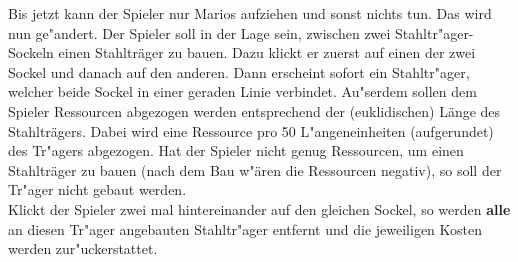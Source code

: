 Bis jetzt kann der Spieler nur Marios aufziehen und sonst nichts tun. Das wird nun  ge"andert. Der Spieler soll in der Lage sein, zwischen zwei Stahltr"ager-Sockeln einen Stahlträger zu bauen. Dazu klickt er zuerst auf einen der zwei Sockel und danach auf den anderen. 
Dann erscheint sofort ein Stahltr"ager, welcher beide Sockel in einer geraden Linie verbindet. Au"serdem sollen dem Spieler Ressourcen abgezogen werden entsprechend der (euklidischen) Länge des Stahlträgers. Dabei wird eine Ressource pro 50 L"angeneinheiten (aufgerundet) des Tr"agers abgezogen.
Hat der Spieler nicht genug Ressourcen, um einen Stahlträger zu bauen (nach dem Bau w"ären die Ressourcen negativ), so soll der Tr"ager nicht gebaut werden.\\
Klickt der Spieler zwei mal hintereinander auf den gleichen Sockel, so werden \textbf{alle} an diesen Tr"ager angebauten Stahltr"ager entfernt und die jeweiligen Kosten werden zur"uckerstattet.